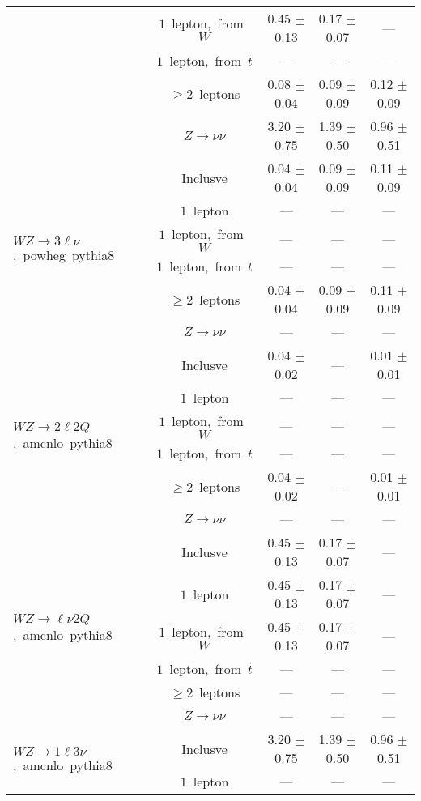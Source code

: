 \documentclass{article}
\begin{document}
\begin{longtable}{|l|c|c|c|c|}
 & $1$~lepton,~from~$W$  & 0.45 $\pm$ 0.13  & 0.17 $\pm$ 0.07  & --- \\* 
 & $1$~lepton,~from~$t$  & ---  & ---  & --- \\* 
 & $\ge2$~leptons  & 0.08 $\pm$ 0.04  & 0.09 $\pm$ 0.09  & 0.12 $\pm$ 0.09 \\* 
 & $Z\rightarrow\nu\nu$  & 3.20 $\pm$ 0.75  & 1.39 $\pm$ 0.50  & 0.96 $\pm$ 0.51 \\* 
\hline 
\multirow{6}{*}{$WZ{\rightarrow}3\ell\nu$,~powheg~pythia8} & Inclusve  & 0.04 $\pm$ 0.04  & 0.09 $\pm$ 0.09  & 0.11 $\pm$ 0.09 \\* 
 & $1$~lepton  & ---  & ---  & --- \\* 
 & $1$~lepton,~from~$W$  & ---  & ---  & --- \\* 
 & $1$~lepton,~from~$t$  & ---  & ---  & --- \\* 
 & $\ge2$~leptons  & 0.04 $\pm$ 0.04  & 0.09 $\pm$ 0.09  & 0.11 $\pm$ 0.09 \\* 
 & $Z\rightarrow\nu\nu$  & ---  & ---  & --- \\* 
\hline 
\multirow{6}{*}{$WZ{\rightarrow}2{\ell}2Q$,~amcnlo~pythia8} & Inclusve  & 0.04 $\pm$ 0.02  & ---  & 0.01 $\pm$ 0.01 \\* 
 & $1$~lepton  & ---  & ---  & --- \\* 
 & $1$~lepton,~from~$W$  & ---  & ---  & --- \\* 
 & $1$~lepton,~from~$t$  & ---  & ---  & --- \\* 
 & $\ge2$~leptons  & 0.04 $\pm$ 0.02  & ---  & 0.01 $\pm$ 0.01 \\* 
 & $Z\rightarrow\nu\nu$  & ---  & ---  & --- \\* 
\hline 
\multirow{6}{*}{$WZ{\rightarrow}{\ell}{\nu}2Q$,~amcnlo~pythia8} & Inclusve  & 0.45 $\pm$ 0.13  & 0.17 $\pm$ 0.07  & --- \\* 
 & $1$~lepton  & 0.45 $\pm$ 0.13  & 0.17 $\pm$ 0.07  & --- \\* 
 & $1$~lepton,~from~$W$  & 0.45 $\pm$ 0.13  & 0.17 $\pm$ 0.07  & --- \\* 
 & $1$~lepton,~from~$t$  & ---  & ---  & --- \\* 
 & $\ge2$~leptons  & ---  & ---  & --- \\* 
 & $Z\rightarrow\nu\nu$  & ---  & ---  & --- \\* 
\hline 
\multirow{6}{*}{$WZ{\rightarrow}1{\ell}3{\nu}$,~amcnlo~pythia8} & Inclusve  & 3.20 $\pm$ 0.75  & 1.39 $\pm$ 0.50  & 0.96 $\pm$ 0.51 \\* 
 & $1$~lepton  & ---  & ---  & --- \\* 

\end{longtable}
\end{document}
